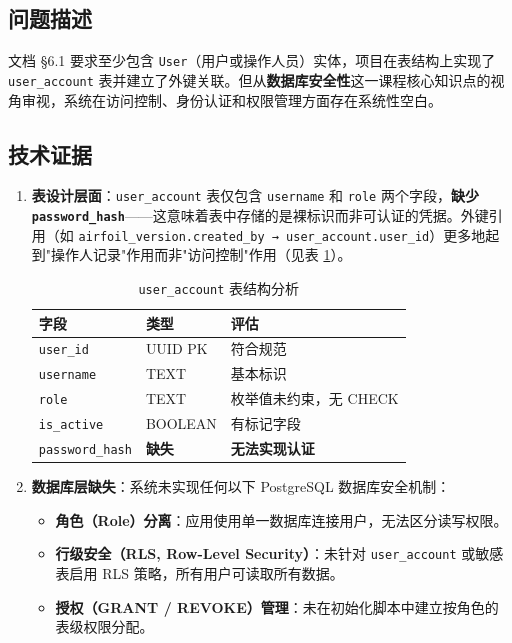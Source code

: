 \documentclass[UTF8,a4paper,11pt]{ctexart}
\begin{document}
\subsection{问题描述}

文档 §6.1 要求至少包含 \texttt{User}（用户或操作人员）实体，项目在表结构上实现了 \texttt{user\_account} 表并建立了外键关联。但从\textbf{数据库安全性}这一课程核心知识点的视角审视，系统在访问控制、身份认证和权限管理方面存在系统性空白。

\subsection{技术证据}

\begin{enumerate}
    \item \textbf{表设计层面}：\texttt{user\_account} 表仅包含 \texttt{username} 和 \texttt{role} 两个字段，\textbf{缺少 \texttt{password\_hash}}——这意味着表中存储的是裸标识而非可认证的凭据。外键引用（如 \texttt{airfoil\_version.created\_by → user\_account.user\_id}）更多地起到"操作人记录"作用而非"访问控制"作用（见表 \ref{tab:user_table}）。
    
    \begin{table}[H]
    \centering
    \caption{\texttt{user\_account} 表结构分析}
    \label{tab:user_table}
    \begin{tabular}{lll}
    \toprule
    字段 & 类型 & 评估 \\
    \midrule
    \texttt{user\_id} & UUID PK & 符合规范 \\
    \texttt{username} & TEXT & 基本标识 \\
    \texttt{role} & TEXT & 枚举值未约束，无 CHECK \\
    \texttt{is\_active} & BOOLEAN & 有标记字段 \\
    \texttt{password\_hash} & \textbf{缺失} & \textbf{无法实现认证} \\
    \bottomrule
    \end{tabular}
    \end{table}

    \item \textbf{数据库层缺失}：系统未实现任何以下 PostgreSQL 数据库安全机制：
    \begin{itemize}
        \item \textbf{角色（Role）分离}：应用使用单一数据库连接用户，无法区分读写权限。
        \item \textbf{行级安全（RLS, Row-Level Security）}：未针对 \texttt{user\_account} 或敏感表启用 RLS 策略，所有用户可读取所有数据。
        \item \textbf{授权（GRANT / REVOKE）管理}：未在初始化脚本中建立按角色的表级权限分配。
    \end{itemize}


\end{enumerate}
\end{document}
